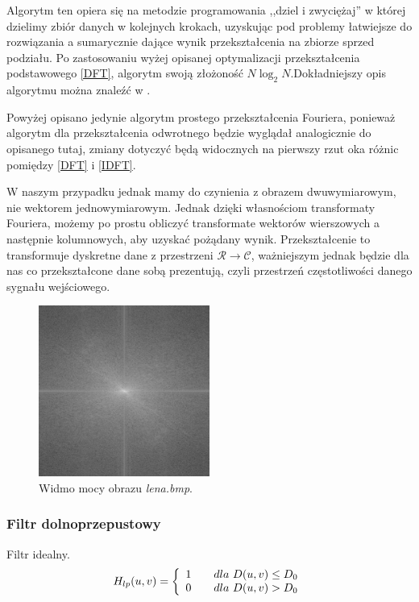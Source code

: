 \documentclass{classrep}
\begin{document}
Algorytm ten opiera się na metodzie programowania ,,dziel i zwyciężaj'' w której dzielimy zbiór danych w kolejnych krokach, uzyskując pod problemy łatwiejsze do rozwiązania a sumarycznie dające wynik przekształcenia na zbiorze sprzed podziału. Po zastosowaniu wyżej opisanej optymalizacji przekształcenia podstawowego \ref{DFT}, algorytm swoją złożoność $N \log _{2} N$.Dokładniejszy opis algorytmu można znaleźć w \cite{1}.

Powyżej opisano jedynie algorytm prostego przekształcenia Fouriera, ponieważ algorytm dla przekształcenia odwrotnego będzie wyglądał analogicznie do opisanego tutaj, zmiany dotyczyć będą widocznych na pierwszy rzut oka różnic pomiędzy \ref{DFT} i \ref{IDFT}.

W naszym przypadku jednak mamy do czynienia z obrazem dwuwymiarowym, nie wektorem jednowymiarowym. Jednak dzięki własnościom transformaty Fouriera, możemy po prostu obliczyć transformate wektorów wierszowych a następnie kolumnowych, aby uzyskać pożądany wynik. Przekształcenie to transformuje dyskretne dane z przestrzeni $\mathcal{R} \rightarrow \mathcal{C}$, ważniejszym jednak będzie dla nas co przekształcone dane sobą prezentują, czyli przestrzeń częstotliwości danego sygnału wejściowego.

\begin{figure}[H]
  \centering
  \includegraphics[width=0.5\textwidth]{img/lena_orig}
  \caption{Widmo mocy obrazu \emph{lena.bmp}.}
  \label{fig_widmo_lena_orig}
\end{figure}


\subsubsection{Filtr dolnoprzepustowy}

Filtr idealny.
\begin{equation}
  H_{lp} (u,v) = \left\{
  \begin{array}{l l}
    1 & \quad dla\ D(u,v) \leq D_0 \\
    0 & \quad dla\ D(u,v) > D_0 \\
  \end{array} \right.
\end{equation}
\end{document}
